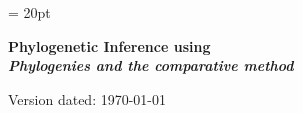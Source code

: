 \documentclass[11pt]{article}
\begin{document}
\renewcommand{\headrulewidth}{0.5pt}
\headsep = 20pt
\lhead{ }
\author{Nicolas Lartillot}
\thispagestyle{plain}
\begin{center}

\textbf{\LARGE Phylogenetic Inference using \RevBayes}\\\vspace{2mm}
\textbf{\it{\Large Phylogenies and the comparative method}}\\\vspace{2mm}
\end{center}

\def \ResourcePath {./}
\def \GlobalResourcePath {../}


Version dated: \today
\end{document}
